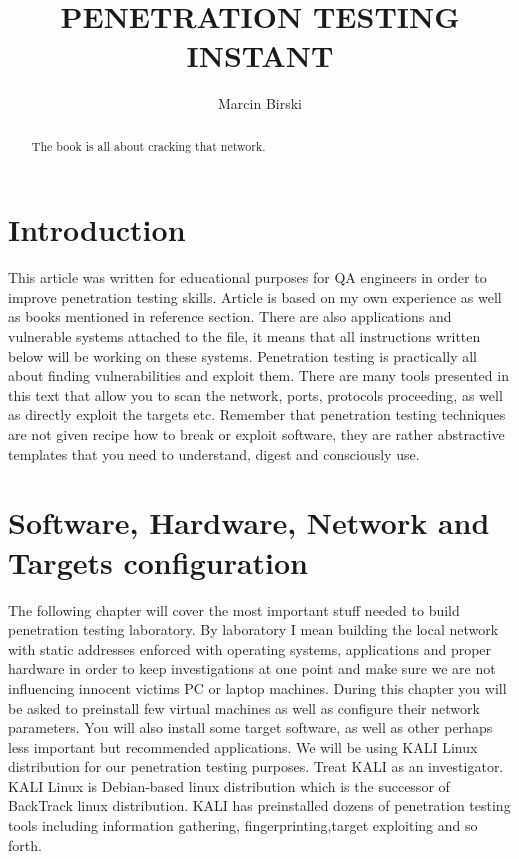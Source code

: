\documentclass{article}[12pt]
\title{\huge{PENETRATION TESTING INSTANT}}
\author{Marcin Birski}
\begin{document}
\begin{center}
\maketitle
\newpage
\end{center}

\begin{abstract}

The book is all about cracking that network.
\end{abstract}


\tableofcontents
\newpage






\section{Introduction}
This article was written for educational purposes for QA engineers in order to improve penetration testing skills. Article is based on my own experience as well as books mentioned in reference section. There are
also applications and vulnerable systems attached to the file, it means that all instructions written below will be working on these systems. Penetration testing is practically all about finding vulnerabilities and exploit them.
There are many tools presented in this text that allow you to scan the network, ports, protocols proceeding, as well as directly exploit the targets etc.
Remember that penetration testing techniques are not given recipe how to break or exploit software, they are rather abstractive templates that you need to understand, digest and consciously use.




\section{Software, Hardware, Network and Targets configuration}
The following chapter will cover the most important stuff needed to build penetration testing laboratory. By laboratory I mean building the local network with static addresses enforced with operating systems, applications and proper hardware in order to keep
investigations at one point and make sure we are not influencing innocent victims PC or laptop machines. During this chapter you will be asked to preinstall few virtual machines as well as configure their network parameters.
You will also install some target software, as well as other perhaps less important but recommended applications.
We will be using KALI Linux distribution for our penetration testing purposes. Treat KALI as an investigator. KALI Linux is Debian-based linux distribution which is the successor of BackTrack linux distribution. KALI has preinstalled
dozens of penetration testing tools including information gathering, fingerprinting,target exploiting and so forth.
\end{document}
